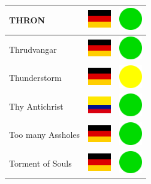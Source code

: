 \documentclass[12pt, a4paper, twoside]{report}
\begin{document}
\begin{center}
\begin{longtable}{|p{5cm}|p{2cm}|p{2cm}|}
			THRON & \includegraphics[width=1cm]{4x3/de} & \includegraphics[width=1cm]{likes/y} \\ \hline
			Thrudvangar & \includegraphics[width=1cm]{4x3/de} & \includegraphics[width=1cm]{likes/y} \\ \hline
			Thunderstorm & \includegraphics[width=1cm]{4x3/de} & \includegraphics[width=1cm]{likes/m} \\ \hline
			Thy Antichrist & \includegraphics[width=1cm]{4x3/co} & \includegraphics[width=1cm]{likes/y} \\ \hline
			Too many Assholes & \includegraphics[width=1cm]{4x3/de} & \includegraphics[width=1cm]{likes/y} \\ \hline
			Torment of Souls & \includegraphics[width=1cm]{4x3/de} & \includegraphics[width=1cm]{likes/y} \\ \hline

\end{longtable}
\end{center}
\end{document}
